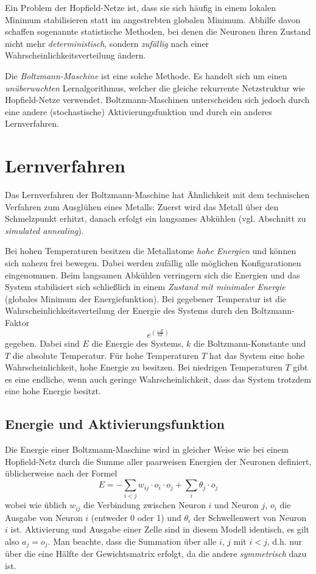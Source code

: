 Ein Problem der Hopfield-Netze ist, dass sie sich häufig in einem lokalen Minimum stabilisieren statt im angestrebten globalen Minimum.
Abhilfe davon schaffen sogenannte statistische Methoden, bei denen die Neuronen ihren Zustand nicht mehr \emph{deterministisch}, sondern \emph{zufällig} nach einer Wahrscheinlichkeitsverteilung ändern.

Die \emph{Boltzmann-Maschine} ist eine solche Methode. Es handelt sich um einen \emph{unüberwachten} Lernalgorithmus, welcher die gleiche rekurrente Netzstruktur wie Hopfield-Netze verwendet. Boltzmann-Maschinen unterscheiden sich jedoch durch eine andere (stochastische) Aktivierungsfunktion und durch ein anderes Lernverfahren.



\section*{Lernverfahren}
Das Lernverfahren der Boltzmann-Maschine hat Ähnlichkeit mit dem technischen Verfahren zum Ausglühen eines Metalls: Zuerst wird das Metall über den Schmelzpunkt erhitzt, danach erfolgt ein langsames Abkühlen (vgl. Abschnitt zu \emph{simulated annealing}).

Bei hohen Temperaturen besitzen die Metallatome \emph{hohe Energien} und können sich nahezu frei bewegen. Dabei werden zufällig alle möglichen Konfigurationen eingenommen. Beim langsamen Abkühlen verringern sich die Energien und das System stabilisiert sich schließlich in einem \emph{Zustand mit minimaler Energie} (globales Minimum der Energiefunktion).
Bei gegebener Temperatur ist die Wahrscheinlichkeitsverteilung der Energie des Systems durch den Boltzmann-Faktor
\[
	e^{(\frac{-E}{kT})}	
\]
gegeben. Dabei sind $E$ die Energie des Systems, $k$ die Boltzmann-Konstante und $T$ die absolute Temperatur.
Für hohe Temperaturen $T$ hat das System eine hohe Wahrscheinlichkeit, hohe Energie zu besitzen. Bei niedrigen Temperaturen $T$ gibt es eine endliche, wenn auch geringe Wahrscheinlichkeit, dass das System trotzdem eine hohe Energie besitzt.


\subsection*{Energie und Aktivierungsfunktion}
Die Energie einer Boltzmann-Maschine wird in gleicher Weise wie bei einem Hopfield-Netz durch die Summe aller paarweisen Energien der Neuronen definiert, üblicherweise nach der Formel
\[
	E = - \sum_{i < j} w_{ij} \cdot o_i \cdot o_j + 
		\sum_i \theta_j \cdot o_j
\]
wobei wie üblich $w_{ij}$ die Verbindung zwischen Neuron $i$ und Neuron $j$, $o_i$ die Ausgabe von Neuron $i$ (entweder 0 oder 1) und $\theta_i$ der Schwellenwert von Neuron $i$ ist.
Aktivierung und Ausgabe einer Zelle sind in diesem Modell identisch, es gilt also $a_j = o_j$.
Man beachte, dass die Summation über alle $i$, $j$ mit $i < j$, d.h. nur über die eine Hälfte der Gewichtsmatrix erfolgt, da die andere \emph{symmetrisch} dazu ist.

